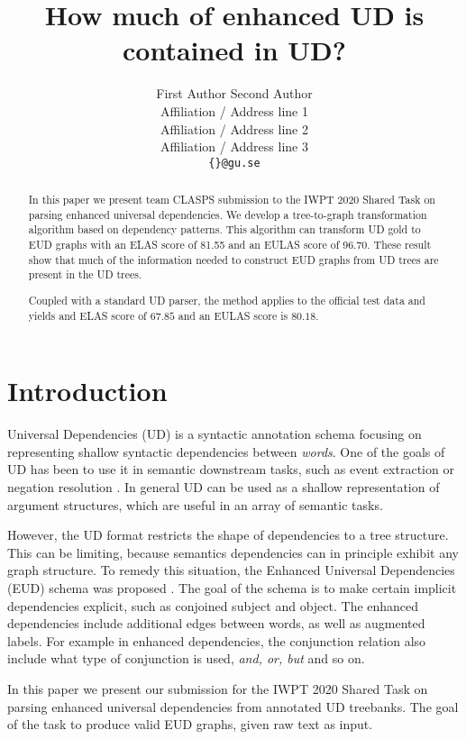 \documentclass[11pt,a4paper]{article}
\title{How much of enhanced UD is contained in UD?}
\author{First Author \qquad Second Author\\
  Affiliation / Address line 1 \\
  Affiliation / Address line 2 \\
  Affiliation / Address line 3 \\
  \texttt{\{\}@gu.se} \\}
\date{}
\begin{document}
\maketitle
    
\begin{abstract}
  In this paper we present team CLASPS submission to the IWPT 2020
  Shared Task on parsing enhanced universal dependencies. We develop a
  tree-to-graph transformation algorithm based on dependency
  patterns. This algorithm can transform UD gold to EUD graphs with an
  ELAS score of 81.55 and an EULAS score of 96.70.  These result show
  that much of the information needed to construct EUD graphs from UD
  trees are present in the UD trees.

  Coupled with a standard UD parser, the method applies to the
  official test data and yields and ELAS score of $67.85$ and an EULAS
  score is $80.18$.
\end{abstract}

\section{Introduction}
Universal Dependencies (UD) is a syntactic annotation schema
focusing on representing shallow syntactic dependencies between
\emph{words}. One of the goals of UD has been to use it in
semantic downstream tasks, such as event extraction
\citep{fares20182018, mcclosky2011event} or negation resolution
\citep{fares20182018}. In general UD can be used as a shallow representation
of argument structures, which are useful in an array of semantic tasks.

However, the UD format restricts the shape of dependencies to a tree
structure.  This can be limiting, because semantics dependencies can
in principle exhibit any graph structure.
To remedy this situation, the Enhanced Universal Dependencies
(EUD) schema was proposed \citep{schuster2016enhanced}. The goal
of the schema is to make certain implicit dependencies explicit,
such as conjoined subject and object. The enhanced dependencies
include additional edges between words, as well as augmented
labels. For example in enhanced dependencies, the conjunction
relation also include what type of conjunction is used,
\textit{and, or, but} and so on.

In this paper we present our submission for the IWPT 2020 Shared
Task on parsing enhanced universal dependencies from annotated UD
treebanks. The goal of the task to produce valid
EUD graphs, given raw text as input.
\end{document}
